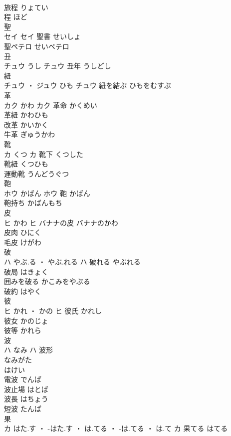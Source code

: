 \documentclass[8pt]{extreport}
\begin{document}
\begin{CJK}{UTF8}{min}
\\	旅程	りょてい	
\\	程	ほど	
\\	聖	
\\	セイ		セイ	聖書	せいしょ	
\\	聖ペテロ	せいペテロ	
\\	丑	
\\	チュウ	うし	チュウ	丑年	うしどし	
\\	紐	
\\	チュウ ・ ジュウ	ひも	チュウ													紐を結ぶ	ひもをむすぶ	
\\	革	
\\	カク	かわ	カク	革命	かくめい	
\\	革紐	かわひも	
\\	改革	かいかく	
\\	牛革	ぎゅうかわ	
\\	靴	
\\	カ	くつ	カ	靴下	くつした	
\\	靴紐	くつひも	
\\	運動靴	うんどうぐつ	
\\	鞄	
\\	ホウ	かばん	ホウ													鞄	かばん	
\\	鞄持ち	かばんもち	
\\	皮	
\\	ヒ	かわ	ヒ	バナナの皮	バナナのかわ	
\\	皮肉	ひにく	
\\	毛皮	けがわ	
\\	破	
\\	ハ	やぶ.る ・ やぶ.れる	ハ	破れる	やぶれる	
\\	破局	はきょく	
\\	囲みを破る	かこみをやぶる	
\\	破約	はやく	
\\	彼	
\\	ヒ	かれ ・ かの	ヒ	彼氏	かれし	
\\	彼女	かのじょ	
\\	彼等	かれら	
\\	波	
\\	ハ	なみ	ハ	波形 
\\	なみがた 
\\	はけい	
\\	電波	でんぱ	
\\	波止場	はとば	
\\	波長	はちょう	
\\	短波	たんぱ	
\\	果	
\\	カ	はた.す ・ -はた.す ・ は.てる ・ -は.てる ・ は.て	カ	果てる	はてる	

\end{CJK}
\end{document}
